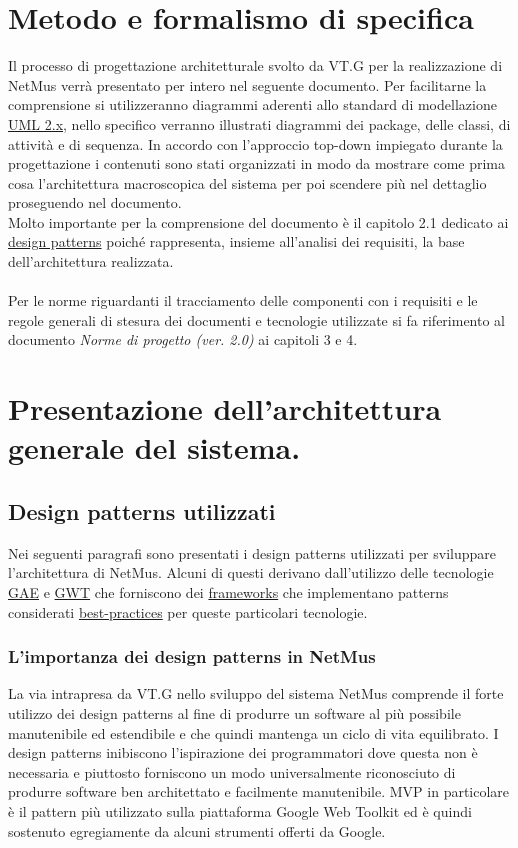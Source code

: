 \section{Metodo e formalismo di specifica}
Il processo di progettazione architetturale svolto da VT.G per la
realizzazione di NetMus verr\`a presentato per intero nel seguente documento. Per
facilitarne la comprensione si utilizzeranno diagrammi aderenti allo
standard di modellazione \underline{UML 2.x}, nello specifico verranno
illustrati diagrammi dei package, delle classi, di attivit\`a e di sequenza.
In accordo con l'approccio top-down impiegato durante la progettazione i
contenuti sono stati organizzati in modo da mostrare come prima cosa
l'architettura macroscopica del sistema per poi scendere pi\`u nel dettaglio
proseguendo nel documento.\\
Molto importante per la comprensione del documento \`e il capitolo 2.1 dedicato
ai \underline{design patterns} poich\'e rappresenta, insieme all'analisi dei requisiti, la
base dell'architettura realizzata.
\\\\
Per le norme riguardanti il tracciamento delle componenti con i requisiti e le
regole generali di stesura dei documenti e tecnologie utilizzate si fa
riferimento al documento \emph{Norme di progetto (ver. 2.0)} ai capitoli 3 e 4.

\section{Presentazione dell'architettura generale del sistema.}

\subsection{Design patterns utilizzati}
Nei seguenti paragrafi sono presentati i design patterns utilizzati per
sviluppare l'architettura di NetMus. Alcuni di questi derivano dall'utilizzo
delle tecnologie \underline{GAE} e \underline{GWT} che forniscono dei
\underline{frameworks} che implementano patterns considerati \underline{best-practices} per queste particolari
tecnologie.

\subsubsection{L'importanza dei design patterns in NetMus}
La via intrapresa da VT.G nello sviluppo del sistema NetMus comprende il forte
utilizzo dei design patterns al fine di produrre un software al pi\`u
possibile manutenibile ed estendibile e che quindi mantenga un ciclo di
vita equilibrato. 
I design patterns inibiscono l'ispirazione dei programmatori dove
questa non \`e necessaria e piuttosto forniscono un modo universalmente
riconosciuto di produrre software ben architettato e facilmente manutenibile.
MVP in particolare \`e il pattern pi\`u utilizzato sulla piattaforma Google Web
Toolkit ed \`e quindi sostenuto egregiamente da alcuni strumenti offerti da
Google.

